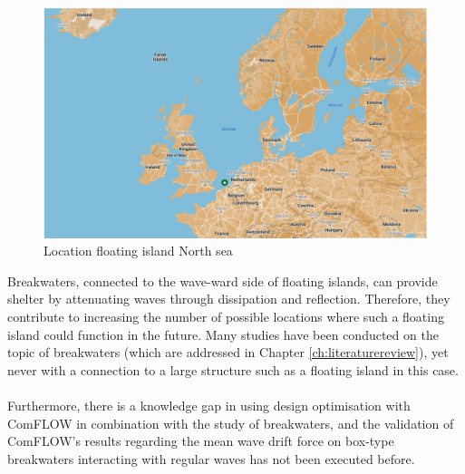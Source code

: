 \begin{figure}[H]
    \centering
    \includegraphics[width=1\linewidth]{figures/Literature_Introduction/location_NS.PNG}
    \caption{Location floating island North sea}
    \label{fig:locationNS}
\end{figure}

Breakwaters, connected to the wave-ward side of floating islands, can provide shelter by attenuating waves through dissipation and reflection. Therefore, they contribute to increasing the number of possible locations where such a floating island could function in the future. Many studies have been conducted on the topic of breakwaters (which are addressed in Chapter \ref{ch:literaturereview}), yet never with a connection to a large structure such as a floating island in this case. \\
\\
Furthermore, there is a knowledge gap in using design optimisation with ComFLOW in combination with the study of breakwaters, and the validation of ComFLOW's results regarding the mean wave drift force on box-type breakwaters interacting with regular waves has not been executed before. 


